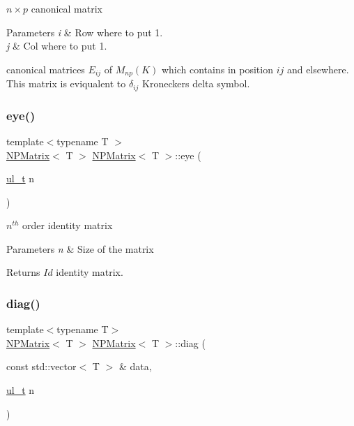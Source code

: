$ n \times p $ canonical matrix 


\begin{DoxyParams}{Parameters}
{\em i} & Row where to put 1. \\
\hline
{\em j} & Col where to put 1.\\
\hline
\end{DoxyParams}
canonical matrices $ E_{ij} $ of $ M_{np}(K) $ which contains {} in position $ ij $ and {} elsewhere. This matrix is eviqualent to $ \delta_{ij} $ Kronecker\textquotesingle{}s delta symbol. \mbox{\label{class_n_p_matrix_a38961696b973ca0ff6ac098580c6974f}} 
\subsubsection{\texorpdfstring{eye()}{eye()}}
{\footnotesize\ttfamily template$<$typename T $>$ \\
\mbox{\hyperlink{class_n_p_matrix}{N\+P\+Matrix}}$<$ T $>$ \mbox{\hyperlink{class_n_p_matrix}{N\+P\+Matrix}}$<$ T $>$\+::eye (\begin{DoxyParamCaption}\item[{\mbox{\hyperlink{group___n_algebra_ga1b140a2034db3f5dfe18a987745df43a}{ul\+\_\+t}}}]{n }\end{DoxyParamCaption})\hspace{0.3cm}{\ttfamily [static]}}



$ n^{th} $ order identity matrix 


\begin{DoxyParams}{Parameters}
{\em n} & Size of the matrix \\
\hline
\end{DoxyParams}
\begin{DoxyReturn}{Returns}
$ Id $ identity matrix. 
\end{DoxyReturn}
\mbox{\label{class_n_p_matrix_ae73ef1ba99fe04c35af30adc3bfbd1dc}} 
\subsubsection{\texorpdfstring{diag()}{diag()}}
{\footnotesize\ttfamily template$<$typename T$>$ \\
\mbox{\hyperlink{class_n_p_matrix}{N\+P\+Matrix}}$<$ T $>$ \mbox{\hyperlink{class_n_p_matrix}{N\+P\+Matrix}}$<$ T $>$\+::diag (\begin{DoxyParamCaption}\item[{const std\+::vector$<$ T $>$ \&}]{data,  }\item[{\mbox{\hyperlink{group___n_algebra_ga1b140a2034db3f5dfe18a987745df43a}{ul\+\_\+t}}}]{n }\end{DoxyParamCaption})\hspace{0.3cm}{\ttfamily [static]}}



